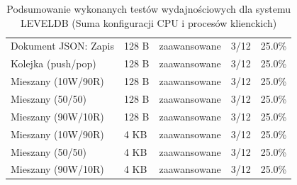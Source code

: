 \begin{table}[ht]
{\begin{tabular}{lllcc}
Dokument JSON: Zapis & 128 B & zaawansowane & 3/12 & 25.0\% \\
Kolejka (push/pop) & 128 B & zaawansowane & 3/12 & 25.0\% \\
Mieszany (10W/90R) & 128 B & zaawansowane & 3/12 & 25.0\% \\
Mieszany (50/50) & 128 B & zaawansowane & 3/12 & 25.0\% \\
Mieszany (90W/10R) & 128 B & zaawansowane & 3/12 & 25.0\% \\
Mieszany (10W/90R) & 4 KB & zaawansowane & 3/12 & 25.0\% \\
Mieszany (50/50) & 4 KB & zaawansowane & 3/12 & 25.0\% \\
Mieszany (90W/10R) & 4 KB & zaawansowane & 3/12 & 25.0\% \\
\bottomrule
\end{tabular}%
}
\caption{Podsumowanie wykonanych testów wydajnościowych dla systemu LEVELDB (Suma konfiguracji CPU i procesów klienckich)}
\label{tab:executed_tests_leveldb}
\end{table}

